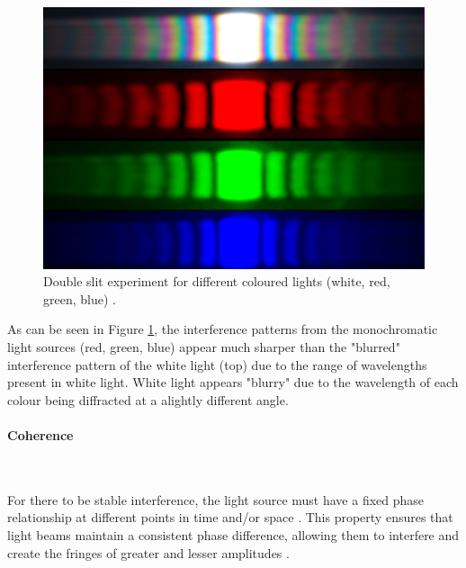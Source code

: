\documentclass[12pt]{article}
\begin{document}
\begin{figure}[H]
    \centering
    \includegraphics[width=.5\textwidth]{interference patterns.jpg}
    \caption{\centering Double slit experiment for different coloured lights (white, red, green, blue) \protect\cite{holoimg2}.}
    \label{fig:4}
\end{figure}

As can be seen in Figure \ref{fig:4}, the interference patterns from the monochromatic light sources (red, green, blue) appear much sharper than the "blurred" interference pattern of the white light (top)
due to the range of wavelengths present in white light. White light appears "blurry" due to the wavelength of each colour being diffracted at a alightly different angle.

\paragraph{Coherence} \label{sec:1.3.2} \leavevmode\\
\vspace{-3ex}

For there to be stable interference, the light source must have a fixed phase relationship at different points in time and/or space \cite{wolf2007introduction}.
This property ensures that light beams maintain a consistent phase difference, allowing them to interfere and create the fringes of greater and lesser amplitudes
\cite{Born_Wolf_Bhatia_Clemmow_Gabor_Stokes_Taylor_Wayman_Wilcock_1999}.
\end{document}
